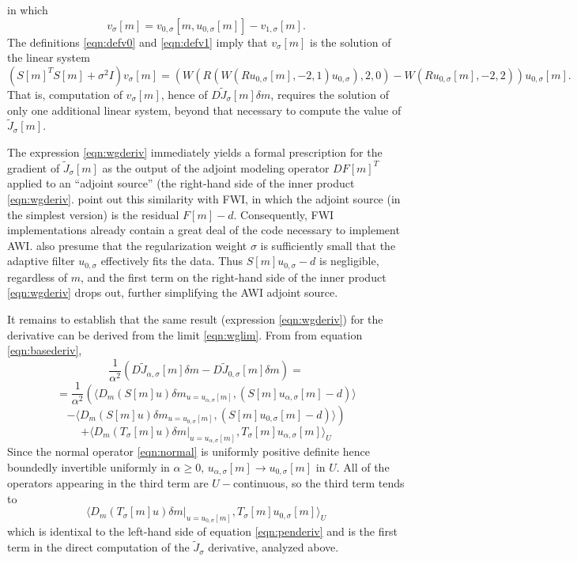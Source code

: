 in which
\[
  v_{\sigma}[m] = v_{0,\sigma}[m,u_{0,\sigma}[m]] -  v_{1,\sigma}[m].
\]
The definitions \ref{eqn:defv0} and \ref{eqn:defv1} imply that
$v_{\sigma}[m]$ is the solution of the linear system
\begin{equation}
  \label{eqn:defvsigma}
  (S[m]^TS[m]+ \sigma^2I) v_{\sigma}[m] =
  (W(R(W(Ru_{0,\sigma}[m],-2,1)u_{0,\sigma}),2,0) - W(Ru_{0,\sigma}[m],-2,2))
  u_{0,\sigma}[m].
\end{equation}
That is, computation of $v_{\sigma}[m]$, hence of $D
\tilde{J}_{\sigma}[m]\delta m$, requires the solution of only one additional
linear system, beyond that necessary to compute the value of $\tilde{J}_{\sigma}[m]$.

 The expression \ref{eqn:wgderiv} immediately
yields a formal prescription for the gradient of
$\tilde{J}_{\sigma}[m]$ as the output of the adjoint modeling operator
$DF[m]^T$ applied to an ``adjoint source'' (the right-hand side of the
inner product \ref{eqn:wgderiv}. \cite{Warner:16} point out this
similarity with FWI, in which the adjoint source (in the simplest
version) is the residual $F[m]-d$. Consequently, FWI implementations
already contain a great deal of the code necessary to implement
AWI. \cite{Warner:16} also presume that the regularization weight
$\sigma$ is sufficiently small that the adaptive filter $u_{0,\sigma}$
effectively fits the data. Thus $S[m]u_{0,\sigma}-d$ is negligible,
regardless of $m$, and the first term on the right-hand side of the
inner product \ref{eqn:wgderiv} drops out, further simplifying the AWI
adjoint source.

It remains to establish that the same result (expression
\ref{eqn:wgderiv}) for the derivative can be derived from the
limit \ref{eqn:wglim}. From from equation \ref{eqn:basederiv},
\[
  \frac{1}{\alpha^2}(D \tilde{J}_{\alpha,\sigma}[m] \delta m - D
  \tilde{J}_{0,\sigma}[m]\delta m) =
\]
\[
  = \frac{1}{\alpha^2} \left(\langle D_m(S[m]u)\delta m_{u =  u_{\alpha,\sigma}[m]}, (S[m]u_{\alpha,\sigma}[m]-d) \rangle\right.
\]
\[
  - \left.\langle D_m(S[m]u)\delta m_{u =  u_{0,\sigma}[m]}, (S[m]u_{0,\sigma}[m]-d) \rangle\right)
\]
\[
  +  \langle D_m(T_{\sigma}[m]u)\delta
  m|_{u=u_{\alpha,\sigma}[m]},T_{\sigma}[m]u_{\alpha,\sigma}[m]\rangle_U
\]
Since the normal operator \ref{eqn:normal} is uniformly positive
definite hence boundedly invertible uniformly in $\alpha \ge 0$,
$u_{\alpha,\sigma}[m] \rightarrow u_{0,\sigma}[m]$ in $U$. All of the
operators appearing in the third term are $U-$continuous, so  the
third term tends to
\[
  \langle D_m(T_{\sigma}[m]u)\delta
  m|_{u=u_{0,\sigma}[m]},T_{\sigma}[m]u_{0,\sigma}[m]\rangle_U
\]
which is identixal to the left-hand side of equation
\ref{eqn:penderiv} and is the first term in the direct computation of
the $\tilde{J}_{\sigma}$ derivative, analyzed above.



